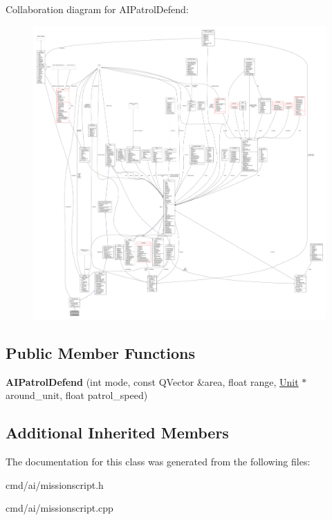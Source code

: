 Collaboration diagram for A\+I\+Patrol\+Defend\+:
\nopagebreak
\begin{figure}[H]
\begin{center}
\leavevmode
\includegraphics[width=350pt]{d2/d31/classAIPatrolDefend__coll__graph}
\end{center}
\end{figure}
\subsection*{Public Member Functions}
\begin{DoxyCompactItemize}
\item 
{\bfseries A\+I\+Patrol\+Defend} (int mode, const Q\+Vector \&area, float range, \hyperlink{classUnit}{Unit} $\ast$around\+\_\+unit, float patrol\+\_\+speed)\hypertarget{classAIPatrolDefend_a2eccdd1c02aed3ec38cea9d6916c2c7e}{}\label{classAIPatrolDefend_a2eccdd1c02aed3ec38cea9d6916c2c7e}

\end{DoxyCompactItemize}
\subsection*{Additional Inherited Members}


The documentation for this class was generated from the following files\+:\begin{DoxyCompactItemize}
\item 
cmd/ai/missionscript.\+h\item 
cmd/ai/missionscript.\+cpp\end{DoxyCompactItemize}
